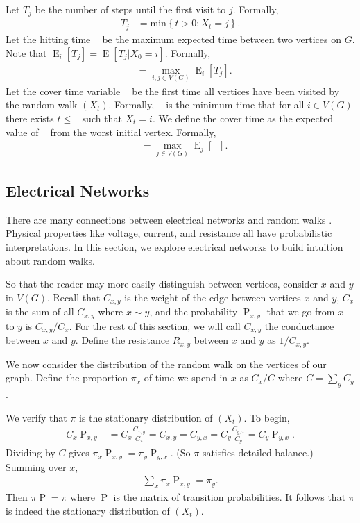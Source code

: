 \documentclass[12pt]{article}
\theoremstyle{definition}
\DeclareMathOperator{\E}{\mathrm{E}}		     %
\DeclareMathOperator{\pr}{\mathrm{P}}		     %
\DeclareMathOperator{\cov}{\uptau_\textrm{cov}}  %
\DeclareMathOperator{\tcov}{t_\textrm{cov}}      %
\DeclareMathOperator{\hit}{t_{\textrm{hit}}}     %
\begin{document}
Let $T_{j}$ be the number of steps until the first visit to $j$.
Formally,
\begin{align}
T_{j} &= \textrm{min} \left\{t > 0 : X_t = j \right\}. \nonumber
\end{align}
Let the hitting time $\hit$ be the maximum expected time between two vertices on $G$.
Note that $\E_i[T_j] = \E[T_j | X_0 = i]$.
Formally, 
\begin{align}
\hit &= \max_{i,j \in V(G)} \E_i[T_j]. \nonumber
\end{align}
Let the cover time variable $\cov$ be the first time all vertices have been
visited by the random walk $(X_t)$.
Formally, $\cov$ is the minimum time that for all $i \in V(G)$
there exists $t \leq \cov$ such that $X_t = i$.
We define the cover time as the expected value of $\cov$ from
the worst initial vertex.
Formally,
\begin{align}
\tcov &= \max_{j \in V(G)} \E_j[\cov] . \nonumber
\end{align}

\subsection{Electrical Networks \label{sec:electric}}

There are many connections between electrical networks
and random walks \cite{DS84}.
Physical properties like voltage, current, and resistance
all have probabilistic interpretations.
In this section, we explore electrical networks to build intuition about 
random walks.

So that the reader may more easily distinguish between
vertices, consider $x$ and $y$ in $V(G)$.
Recall that $C_{x,y}$ is the weight of the edge
between vertices $x$ and $y$, $C_x$ is the sum
of all $C_{x,y}$ where $x \sim y$, and the probability $\pr_{x,y}$
that we go from $x$ to $y$ is $C_{x,y}/C_x$.
For the rest of this section, we will call $C_{x,y}$
the conductance between $x$ and $y$.
Define the resistance $R_{x,y}$ between $x$ and $y$
as $1/ C_{x,y}$.

We now consider the distribution of the random
walk on the vertices of our graph.
Define the proportion $\pi_x$ of time we spend in $x$
as $C_x/C$ where $C=\sum_y C_y$.

We verify that $\pi$ is the stationary distribution
of $(X_t)$.
To begin,
\begin{align}
C_x \pr_{x,y} &= C_x \frac{C_{x,y}}{C_x} = C_{x,y} = C_{y,x} 
= C_y \frac{C_{y,x}}{C_y} = C_y \pr_{y,x}. \nonumber
\end{align}
Dividing by $C$ gives $\pi_x \pr_{x,y} = \pi_y \pr_{y,x}$.
(So $\pi$ satisfies detailed balance.)
Summing over $x$,
\begin{align}
\sum_x \pi_x \pr_{x,y} = \pi_y . \nonumber
\end{align}
Then $\pi \pr = \pi$ where $\pr$ is the matrix of transition probabilities.
It follows that $\pi$ is indeed the stationary distribution of $(X_t)$.
\end{document}

